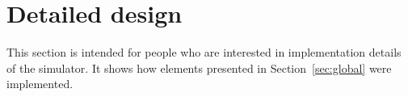 
\graphicspath{{\relativepath/figures/}}

\section{Detailed design}
\label{sec:detailed}

This section is intended for people who are interested in implementation
details of the simulator.
It shows how elements presented in Section~\ref{sec:global} were implemented.





